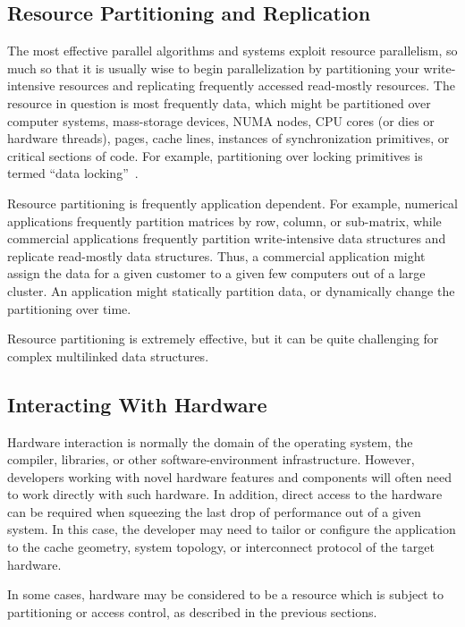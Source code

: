 \subsection{Resource Partitioning and Replication}
\label{sec:Resource Partitioning and Replication}

The most effective parallel algorithms and systems exploit resource
parallelism, so much so that it is
usually wise to begin parallelization by partitioning your write-intensive
resources and replicating frequently accessed read-mostly resources.
The resource in question is most frequently data, which might be
partitioned over computer systems, mass-storage devices, NUMA nodes,
CPU cores (or dies or hardware threads), pages, cache lines, instances
of synchronization primitives, or critical sections of code.
For example, partitioning over locking primitives is termed
``data locking''~\cite{Beck85}.

Resource partitioning is frequently application dependent.
For example, numerical applications frequently partition matrices
by row, column, or sub-matrix, while commercial applications frequently
partition write-intensive data structures and replicate
read-mostly data structures.
Thus, a commercial application might assign the data for a
given customer to a given few computers out of a large cluster.
An application might statically partition data, or dynamically
change the partitioning over time.

Resource partitioning is extremely effective, but
it can be quite challenging for complex multilinked data
structures.

\subsection{Interacting With Hardware}
\label{sec:Interacting With Hardware}

Hardware interaction is normally the domain of the operating system,
the compiler, libraries, or other software-environment infrastructure.
However, developers working with novel hardware features and components
will often need to work directly with such hardware.
In addition, direct access to the hardware can be required when squeezing
the last drop of performance out of a given system.
In this case, the developer may need to tailor or configure the application
to the cache geometry, system topology, or interconnect protocol of the
target hardware.

In some cases, hardware may be considered to be a resource which
is subject to partitioning or access control, as described in
the previous sections.

